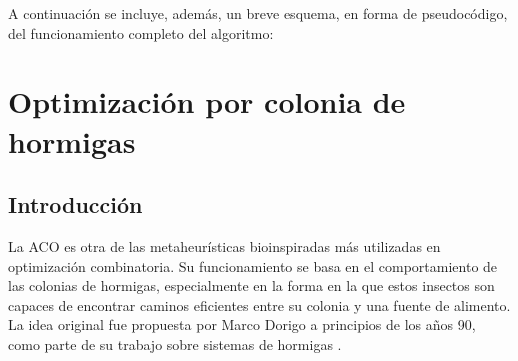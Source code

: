 A continuación se incluye, además, un breve esquema, en forma de pseudocódigo, del funcionamiento completo del algoritmo:

\vspace{1.5em}

\begin{algorithm}[H]
\caption{Pseudocódigo del algoritmo genético propuesto para el TSP}
\label{alg:ga}
\DontPrintSemicolon


\end{algorithm}

\newpage

\section{Optimización por colonia de hormigas}
\label{sec:aco}

\subsection{Introducción}
\label{subsec:aco_intro}

La \ac{ACO} es otra de las metaheurísticas bioinspiradas más utilizadas en optimización combinatoria. Su funcionamiento se
basa en el comportamiento de las colonias de hormigas, especialmente en la forma en la que estos insectos son capaces de 
encontrar caminos eficientes entre su colonia y una fuente de alimento. La idea original fue propuesta por Marco Dorigo a
principios de los años 90, como parte de su trabajo sobre sistemas de hormigas \cite{dorigo1991}.

